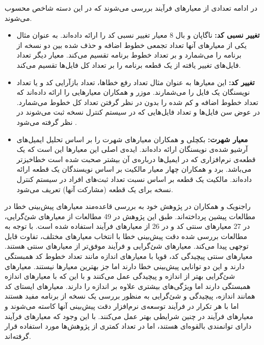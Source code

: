 در ادامه  تعدادی از معیارهای فرآیند بررسی می‌شوند که در این دسته شاخص محسوب می‌شوند. 
\begin{itemize}
\item \textbf{تغییر نسبی کد: }
ناگاپان و بال 8 معیار تغییر نسبی کد را ارائه داده‌اند\cite{nagappan2005use}. به عنوان مثال یکی از معیار‌های آنها تعداد تجمعی خطوط اضافه و حذف شده بین دو نسخه از برنامه را می‌شمارد و بر تعداد خطوط برنامه تقسیم می‌کند. معیار دیگر تعداد فایل‌های تغییر یافته از یک قطعه برنامه را بر تعداد  کل فایل‌ها تقسیم می‌کند. 
\item \textbf{تغییر کد: }
این معیارها به عنوان مثال تعداد رفع خطاها، تعداد بازآرایی کد و یا تعداد نویسنگان یک فایل را می‌شمارند. موزر و همکاران معیارهایی را ارائه داده‌اند که تعداد خطوط اضافه و کم شده را بدون در نظر گرفتن تعداد کل خطوط می‌شمارد. در عوض سن فایل‌ها و تعداد فایل‌هایی که در سیستم کنترل نسخه ثبت می‌شوند در نظر گرفته می‌شود \cite{moser2008comparative}. 
\item \textbf{معیار شهرت: }
 بکچلی و همکاران معیارهای شهرت را بر اساس تحلیل ایمیل‌های آرشیو شده‌ی نویسنگان ارائه داده‌اند. ایده‌ی اصلی این معیارها این است که یک قطعه‌ی  نرم‌افزاری که در ایمیل‌ها درباره‌ی آن بیشتر صحبت شده است خطاخیزتر می‌باشد\cite{bacchelli2010popular}. برد و همکاران چهار معیار مالکیت بر اساس نویسندگان یک قطعه ارائه داده‌اند. مالکیت یک قطعه بر اساس نسبت  تعداد ثبت‌های افراد در سیستم کنترل نسخه برای یک قطعه (مشارکت آنها) تعریف می‌شود. \\
\end{itemize}


راجنویک و همکاران در پژوهش خود به بررسی قاعده‌مند معیارهای پیش‌بینی خطا در مطالعات پیشین پرداخته‌اند.  طبق این پژوهش در 49\lr{\%} مطالعات از معیارهای شئ‌گرایی، در 27\lr{\%} معیارهای سنتی کد و در 26 \lr{\%} از معیارهای فرآیند استفاده شده است. با توجه به مطالعات بررسی شده دقت پیش‌بینی خطا  با انتخاب معیارهای مختلف، تفاوت قابل توجهی  پیدا می‌کند. معیارهای شئ‌گرایی و فرآیند موفق‌تر از معیارهای سنتی هستند. معیارهای سنتی  پیچیدگی کد، قویا با معیارهای اندازه مانند تعداد خطوط کد همبستگی دارند و این دو توانایی پیش‌بینی خطا دارند اما جز بهترین معیارها نیستند. معیارهای شئ‌گرایی بهتر از اندازه و پیچیدگی عمل می‌کنند و با این که با معیارهای اندازه همبستگی دارند اما ویژگی‌های بیشتری علاوه بر اندازه را دارند. معیارهای ایستای کد همانند اندازه، پیچیدگی و شئ‌گرایی به منظور بررسی یک نسخه از برنامه مفید هستند اما با هر تکرار در فرآیند توسعه‌ی نرم‌افزار دقت پیش‌بینی آنها کاسته می‌شوند و معیارهای فرآیند در چنین شرایطی بهتر عمل می‌کنند.  با این وجود  که  معیارهای فرآیند‌  دارای توانمندی بالقوه‌ای  هستند، اما در تعداد کمتری از پژوهش‌ها مورد استفاده قرار گرفته‌اند\cite{radjenovic2013software}. \\
 
